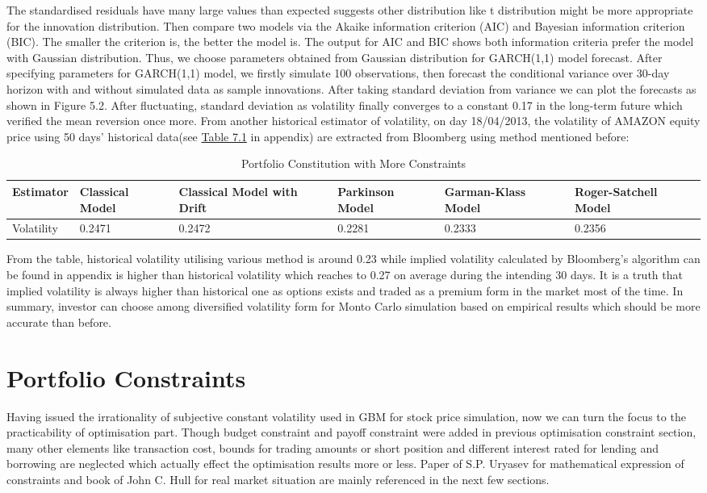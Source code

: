 The standardised residuals have many large values than expected suggests other distribution like t distribution might be more appropriate for the innovation distribution. Then compare two models via the Akaike information criterion (AIC) and Bayesian information criterion (BIC). The smaller the criterion is, the better the model is. The output for AIC and BIC shows both information criteria prefer the model with Gaussian distribution. Thus, we choose parameters obtained from Gaussian distribution for GARCH(1,1) model forecast. After specifying parameters for GARCH(1,1) model, we firstly simulate 100 observations, then forecast the conditional variance over 30-day horizon with and without simulated data as sample innovations. After taking standard deviation from variance we can plot the forecasts as shown in Figure 5.2. After fluctuating, standard deviation as volatility finally converges to a constant 0.17 in the long-term future which verified the mean reversion once more. From another historical estimator of volatility, on day 18/04/2013, the volatility of AMAZON equity price using 50 days' historical data(see \hyperref[Table 7.1]{Table 7.1} in appendix) are extracted from Bloomberg using method mentioned before:
\begin{table}[h!]
\centering
\caption{Portfolio Constitution with More Constraints}
\begin{tabular}{ |p{1.9cm}||p{1.8cm}|p{1.8cm}|p{1.8cm}|p{1.8cm}|p{1.8cm}|}
 \hline
Estimator & Classical Model &Classical Model with Drift&Parkinson Model&Garman-Klass Model&Roger-Satchell Model\\
\hline
Volatility&0.2471&0.2472&0.2281&0.2333&0.2356\\
 \hline
\end{tabular}
\end{table}
From the table, historical volatility utilising various method is around 0.23 while implied volatility calculated by Bloomberg's algorithm can be found in appendix is higher than historical volatility which reaches to 0.27 on average during the intending 30 days. It is a truth that implied volatility is always higher than historical one as options exists and traded as a premium form in the market most of the time. In summary, investor can choose among diversified volatility form for Monto Carlo simulation based on empirical results which should be more accurate than before. 

\section{Portfolio Constraints}
Having issued the irrationality of subjective constant volatility used in GBM for stock price simulation, now we can turn the focus to the practicability of optimisation part. Though budget constraint and payoff constraint were added in previous optimisation constraint section, many other elements like transaction cost, bounds for trading amounts or short position and different interest rated for lending and borrowing are neglected which actually effect the optimisation results more or less. Paper of S.P. Uryasev \cite{10} for mathematical expression of constraints and book of John C. Hull \cite{12} for real market situation are mainly referenced in the next few sections. 
